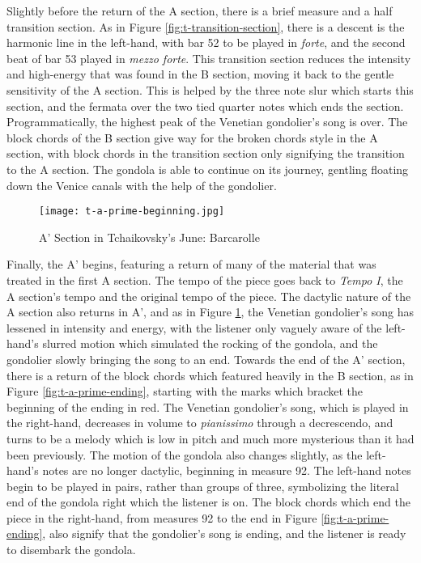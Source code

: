 Slightly before the return of the A section, there is a brief measure and a half transition section. As in Figure \ref{fig:t-transition-section}\autocite{Henle_2002}, there is a descent is the harmonic line in the left-hand, with bar 52 to be played in \textit{forte}, and the second beat of bar 53 played in \textit{mezzo forte}. This transition section reduces the intensity and high-energy that was found in the B section, moving it back to the gentle sensitivity of the A section. This is helped by the three note slur which starts this section, and the fermata over the two tied quarter notes which ends the section. Programmatically, the highest peak of the Venetian gondolier's song is over. The block chords of the B section give way for the broken chords style in the A section, with block chords in the transition section only signifying the transition to the A section. The gondola is able to continue on its journey, gentling floating down the Venice canals with the help of the gondolier.

\begin{figure}
  \centering
  \texttt{[image: t-a-prime-beginning.jpg]}
  \caption{A' Section in Tchaikovsky's June: Barcarolle}
  \label{fig:t-a-prime-beginning}
\end{figure}


Finally, the A' begins, featuring a return of many of the material that was treated in the first A section. The tempo of the piece goes back to \textit{Tempo I}, the A section's tempo and the original tempo of the piece. The dactylic nature of the A section also returns in A', and as in Figure \ref{fig:t-a-prime-beginning}\autocite{Henle_2002}, the Venetian gondolier's song has lessened in intensity and energy, with the listener only vaguely aware of the left-hand's slurred motion which simulated the rocking of the gondola, and the gondolier slowly bringing the song to an end. Towards the end of the A' section, there is a return of the block chords which featured heavily in the B section, as in Figure \ref{fig:t-a-prime-ending}\autocite{Henle_2002}, starting with the marks which bracket the beginning of the ending in red. The Venetian gondolier's song, which is played in the right-hand, decreases in volume to \textit{pianissimo} through a decrescendo, and turns to be a melody which is low in pitch and much more mysterious than it had been previously. The motion of the gondola also changes slightly, as the left-hand's notes are no longer dactylic, beginning in measure 92. The left-hand notes begin to be played in pairs, rather than groups of three, symbolizing the literal end of the gondola right which the listener is on. The block chords which end the piece in the right-hand, from measures 92 to the end in Figure \ref{fig:t-a-prime-ending}\autocite{Henle_2002}, also signify that the gondolier's song is ending, and the listener is ready to disembark the gondola.

